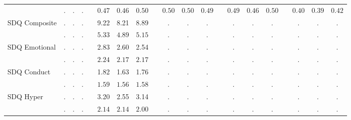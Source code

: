 \begin{landscape}
\begin{center}
{\begin{longtable}{L{5cm} c c c p{.5cm} c c c p{.5cm} c c c p{.5cm} c c c p{.5cm} c c c}
& $\mathit{        .}$ & $\mathit{        .}$ & $\mathit{        .}$ & & $\mathit{     0.47}$ & $\mathit{     0.46}$ & $\mathit{     0.50}$ & & $\mathit{     0.50}$ & $\mathit{     0.50}$ & $\mathit{     0.49}$ & & $\mathit{     0.49}$ & $\mathit{     0.46}$ & $\mathit{     0.50}$ & & $\mathit{     0.40}$ & $\mathit{     0.39}$ & $\mathit{     0.42}$ \\[1.6em]
SDQ Composite & . &         . &         . & &      9.22 &      8.21 &      8.89 & &         . &         . &         . & &         . &         . &         . & &         . &         . &         . \\*
& $\mathit{        .}$ & $\mathit{        .}$ & $\mathit{        .}$ & & $\mathit{     5.33}$ & $\mathit{     4.89}$ & $\mathit{     5.15}$ & & $\mathit{        .}$ & $\mathit{        .}$ & $\mathit{        .}$ & & $\mathit{        .}$ & $\mathit{        .}$ & $\mathit{        .}$ & & $\mathit{        .}$ & $\mathit{        .}$ & $\mathit{        .}$ \\[1.6em]
SDQ Emotional & . &         . &         . & &      2.83 &      2.60 &      2.54 & &         . &         . &         . & &         . &         . &         . & &         . &         . &         . \\*
& $\mathit{        .}$ & $\mathit{        .}$ & $\mathit{        .}$ & & $\mathit{     2.24}$ & $\mathit{     2.17}$ & $\mathit{     2.17}$ & & $\mathit{        .}$ & $\mathit{        .}$ & $\mathit{        .}$ & & $\mathit{        .}$ & $\mathit{        .}$ & $\mathit{        .}$ & & $\mathit{        .}$ & $\mathit{        .}$ & $\mathit{        .}$ \\[1.6em]
SDQ Conduct & . &         . &         . & &      1.82 &      1.63 &      1.76 & &         . &         . &         . & &         . &         . &         . & &         . &         . &         . \\*
& $\mathit{        .}$ & $\mathit{        .}$ & $\mathit{        .}$ & & $\mathit{     1.59}$ & $\mathit{     1.56}$ & $\mathit{     1.58}$ & & $\mathit{        .}$ & $\mathit{        .}$ & $\mathit{        .}$ & & $\mathit{        .}$ & $\mathit{        .}$ & $\mathit{        .}$ & & $\mathit{        .}$ & $\mathit{        .}$ & $\mathit{        .}$ \\[1.6em]
SDQ Hyper & . &         . &         . & &      3.20 &      2.55 &      3.14 & &         . &         . &         . & &         . &         . &         . & &         . &         . &         . \\*
& $\mathit{        .}$ & $\mathit{        .}$ & $\mathit{        .}$ & & $\mathit{     2.14}$ & $\mathit{     2.14}$ & $\mathit{     2.00}$ & & $\mathit{        .}$ & $\mathit{        .}$ & $\mathit{        .}$ & & $\mathit{        .}$ & $\mathit{        .}$ & $\mathit{        .}$ & & $\mathit{        .}$ & $\mathit{        .}$ & $\mathit{        .}$ \\[1.6em]

\end{longtable}}
\end{center}
\end{landscape}

